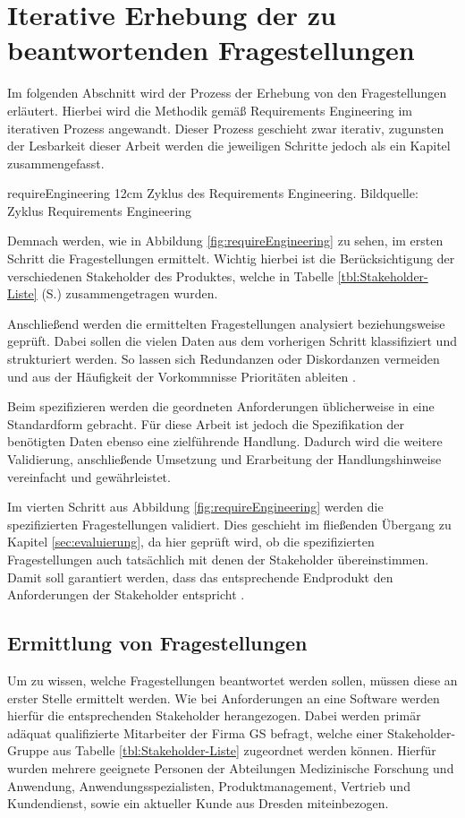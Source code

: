 \section{Iterative Erhebung der zu beantwortenden Fragestellungen}
\label{sec:erhebung}
Im folgenden Abschnitt wird der Prozess der Erhebung von den Fragestellungen erläutert.
Hierbei wird die Methodik gemäß Requirements Engineering \cite{Pohl.2011} im iterativen Prozess angewandt.
Dieser Prozess geschieht zwar iterativ, zugunsten der Lesbarkeit dieser Arbeit werden die jeweiligen Schritte jedoch als ein Kapitel zusammengefasst.

\bild
{requireEngineering}
{12cm}
{Zyklus des Requirements Engineering. Bildquelle: \cite{Patig.}}
{Zyklus Requirements Engineering}

Demnach werden, wie in Abbildung \ref{fig:requireEngineering} zu sehen, im ersten Schritt die Fragestellungen ermittelt.
Wichtig hierbei ist die Berücksichtigung der verschiedenen Stakeholder des Produktes, welche in Tabelle \ref{tbl:Stakeholder-Liste} (S.\pageref{tbl:Stakeholder-Liste}) zusammengetragen wurden.

Anschließend werden die ermittelten Fragestellungen analysiert beziehungsweise geprüft.
Dabei sollen die vielen Daten aus dem vorherigen Schritt klassifiziert und strukturiert werden.
So lassen sich Redundanzen oder Diskordanzen vermeiden und aus der Häufigkeit der Vorkommnisse Prioritäten ableiten \cite[S.100f]{Sommerville.2012}.

Beim spezifizieren werden die geordneten Anforderungen üblicherweise in eine Standardform gebracht.
Für diese Arbeit ist jedoch die Spezifikation der benötigten Daten ebenso eine zielführende Handlung.
Dadurch wird die weitere Validierung, anschließende Umsetzung und Erarbeitung der Handlungshinweise vereinfacht und gewährleistet.

Im vierten Schritt aus Abbildung \ref{fig:requireEngineering} werden die spezifizierten Fragestellungen validiert.
Dies geschieht im fließenden Übergang zu Kapitel \ref{sec:evaluierung}, da hier geprüft wird, ob die spezifizierten Fragestellungen auch tatsächlich mit denen der Stakeholder übereinstimmen.
Damit soll garantiert werden, dass das entsprechende Endprodukt den Anforderungen der Stakeholder entspricht \cite{Patig.}.


\subsection{Ermittlung von Fragestellungen}
Um zu wissen, welche Fragestellungen beantwortet werden sollen, müssen diese an erster Stelle ermittelt werden.
Wie bei Anforderungen an eine Software werden hierfür die entsprechenden Stakeholder herangezogen.
Dabei werden primär adäquat qualifizierte Mitarbeiter der Firma \gls{GS} befragt, welche einer Stakeholder-Gruppe aus Tabelle \ref{tbl:Stakeholder-Liste} zugeordnet werden können.
Hierfür wurden mehrere geeignete Personen der Abteilungen \glqq Medizinische Forschung und Anwendung\grqq, Anwendungsspezialisten, Produktmanagement, Vertrieb und Kundendienst, sowie ein aktueller Kunde aus Dresden miteinbezogen. 

